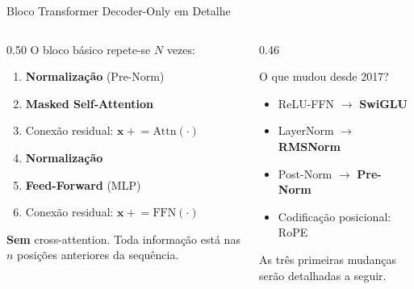 \documentclass[aspectratio=169, xcolor=dvipsnames]{beamer}
\begin{document}
  \begin{frame}{Bloco Transformer Decoder-Only em Detalhe}
    \begin{columns}[T]
      \begin{column}{0.50\textwidth}
        O bloco básico repete-se $N$ vezes:\\[0.3em]
        \begin{enumerate}
          \item \textbf{Normalização} (Pre-Norm)
          \item \textbf{Masked Self-Attention}
          \item Conexão residual: $\mathbf{x} \mathrel{+}= \text{Attn}(\cdot)$
          \item \textbf{Normalização}
          \item \textbf{Feed-Forward} (MLP)
          \item Conexão residual: $\mathbf{x} \mathrel{+}= \text{FFN}(\cdot)$
        \end{enumerate}
        \vspace{0.3em}
        \textbf{Sem} cross-attention. Toda informação está nas $n$ posições anteriores da sequência.
      \end{column}
      \begin{column}{0.46\textwidth}
        \begin{exampleblock}{O que mudou desde 2017?}
          \begin{itemize}
            \item ReLU-FFN $\to$ \textbf{SwiGLU}
            \item LayerNorm $\to$ \textbf{RMSNorm}
            \item Post-Norm $\to$ \textbf{Pre-Norm}
            \item Codificação posicional: RoPE
          \end{itemize}
          As três primeiras mudanças serão detalhadas a seguir.
        \end{exampleblock}
      \end{column}
    \end{columns}
  \end{frame}
\end{document}
